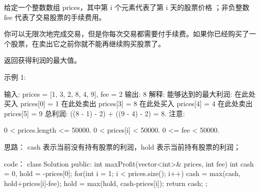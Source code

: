 给定一个整数数组 prices，其中第 i 个元素代表了第 i 天的股票价格 ；非负整数 fee 代表了交易股票的手续费用。

你可以无限次地完成交易，但是你每次交易都需要付手续费。如果你已经购买了一个股票，在卖出它之前你就不能再继续购买股票了。

返回获得利润的最大值。

示例 1:

输入: prices = [1, 3, 2, 8, 4, 9], fee = 2
输出: 8
解释: 能够达到的最大利润:  
在此处买入 prices[0] = 1
在此处卖出 prices[3] = 8
在此处买入 prices[4] = 4
在此处卖出 prices[5] = 9
总利润: ((8 - 1) - 2) + ((9 - 4) - 2) = 8.
注意:

0 < prices.length <= 50000.
0 < prices[i] < 50000.
0 <= fee < 50000.

























思路：
cash 表示当前没有持有股票的利润，hold 表示当前持有股票的利润；


























code：
class Solution {
public:
    int maxProfit(vector<int>& prices, int fee) {
        int cash = 0, hold = -prices[0];
        for(int i = 1; i < prices.size(); i++)
        {
            cash = max(cash, hold+prices[i]-fee);
            hold = max(hold, cash-prices[i]);
        }
        return cash;
    }
};